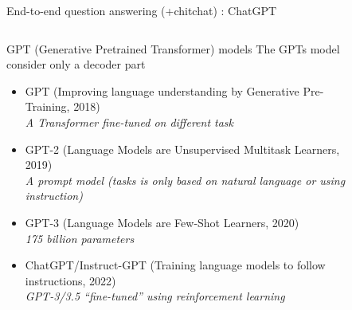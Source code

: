 \documentclass[10pt,aspectratio=169]{beamer}
\begin{document}
\begin{frame}{End-to-end question answering (+chitchat) : ChatGPT}
    \begin{columns}
        \begin{column}{0.5\textwidth}
            \begin{alertblock}{GPT (Generative Pretrained Transformer) models}
                The GPTs model consider only a decoder part
                \begin{itemize}
                    \item GPT \footnotesize{(Improving language understanding by Generative Pre-Training, 2018)} \\
                        \textit{\scriptsize A Transformer fine-tuned on different task}
                    \item GPT-2 \footnotesize{(Language Models are Unsupervised Multitask Learners, 2019)} \\
                        \textit{\scriptsize A prompt model (tasks is only based on natural language or using instruction)}
                    \item GPT-3 \footnotesize{(Language Models are Few-Shot Learners, 2020)} \\
                        \textit{\scriptsize 175 billion parameters}
                    \item ChatGPT/Instruct-GPT \footnotesize{(Training language models to follow instructions, 2022)} \\
                        \textit{\scriptsize GPT-3/3.5 ``fine-tuned'' using reinforcement learning} 
                \end{itemize} 
            \end{alertblock}
        \end{column}
        \begin{column}{0.5\textwidth}
            \begin{figure}
                \centering

\end{figure}
\end{column}
\end{columns}
\end{frame}
\end{document}
